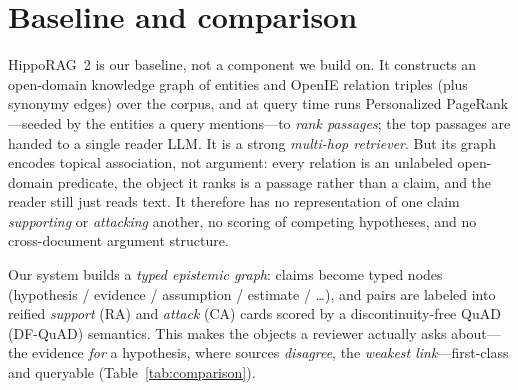 
\section{Baseline and comparison}
\label{sec:comparison}

HippoRAG~2 is our baseline, not a component we build on. It constructs an open-domain
knowledge graph of entities and OpenIE relation triples (plus synonymy edges) over the
corpus, and at query time runs Personalized PageRank---seeded by the entities a query
mentions---to \emph{rank passages}; the top passages are handed to a single reader LLM.
It is a strong \emph{multi-hop retriever}. But its graph encodes topical association, not
argument: every relation is an unlabeled open-domain predicate, the object it ranks is a
passage rather than a claim, and the reader still just reads text. It therefore has no
representation of one claim \emph{supporting} or \emph{attacking} another, no scoring of
competing hypotheses, and no cross-document argument structure.

Our system builds a \emph{typed epistemic graph}: claims become typed nodes
(hypothesis / evidence / assumption / estimate / \ldots), and pairs are labeled into
reified \emph{support} (RA) and \emph{attack} (CA) cards scored by a discontinuity-free
QuAD (DF-QuAD) semantics. This makes the objects a reviewer actually asks about---the
evidence \emph{for} a hypothesis, where sources \emph{disagree}, the \emph{weakest
link}---first-class and queryable (Table~\ref{tab:comparison}).

